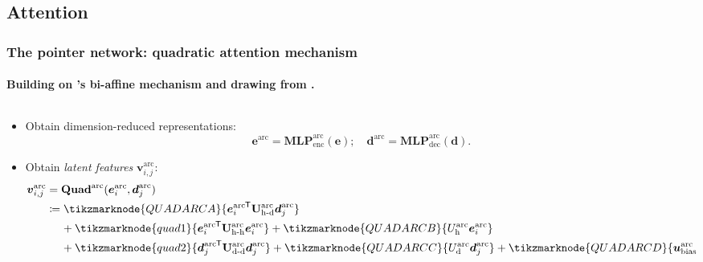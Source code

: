 \documentclass[8pt]{beamer}
\theoremstyle{definition}
\theoremstyle{plain}
\theoremstyle{definition}
\theoremstyle{remark}
\numberwithin{equation}{section}
\numberwithin{figure}{section}
\numberwithin{table}{section}
\newcommand*{\tran}{^{\mkern-1.5mu\mathsf{T}}}
\begin{document}
\subsection{Attention}
\begin{frame}
    \frametitle{The pointer network: quadratic attention mechanism}
    \framesubtitle{Building on \textcite{dozat2016deep}'s bi-affine mechanism and drawing from \textcite{vinyals2015pointer}.}
    \begin{columns}[t,onlytextwidth]
        \begin{column}[t]{0.52\textwidth}
            \begin{itemize}
            \item<2-> Obtain dimension-reduced representations:
            \[
                \boldsymbol{e}^{\text{arc}} = \mathbf{MLP}_{\text{enc}}^{\text{arc}}(\boldsymbol{e}); \quad \boldsymbol{d}^{\text{arc}} = \mathbf{MLP}_{\text{dec}}^{\text{arc}}(\boldsymbol{d}).
            \]

            \item<3-> Obtain \textit{latent features} \(\boldsymbol{v}_{i,j}^{\text{arc}}\):
            \begin{align*}
                \boldsymbol{v}^{\text{arc}}_{i,j} &= \mathbf{Quad}^{\text{arc}}(\boldsymbol{e}^{\text{arc}}_{i}, \boldsymbol{d}^{\text{arc}}_{j}) \\
                &\coloneqq \tikzmarknode{QUADARCA}{{\boldsymbol{e}^{\text{arc}}_{i}}\tran \mathbf{U}_{\text{h-d}}^{\text{arc}} \boldsymbol{d}_{j}^{\text{arc}}} \\
                    &\phantom{\coloneqq}\   + \tikzmarknode{quad1}{
                        {\boldsymbol{e}_{i}^{\text{arc}}}\tran \mathbf{U}_{\text{h-h}}^{\text{arc}} \boldsymbol{e}_{i}^{\text{arc}}
                    } + \tikzmarknode{QUADARCB}{U_{\text{h}}^{\text{arc}} \boldsymbol{e}_{i}^{\text{arc}}} \\
                    &\phantom{\coloneqq}\ + \tikzmarknode{quad2}{{\boldsymbol{d}_{j}^{\text{arc}}}\tran \mathbf{U}_{\text{d-d}}^{\text{arc}} \boldsymbol{d}_{j}^{\text{arc}}}
                    + \tikzmarknode{QUADARCC}{U_{\text{d}}^{\text{arc}} \boldsymbol{d}_{j}^{\text{arc}}}
                    + \tikzmarknode{QUADARCD}{\boldsymbol{u}_{\text{bias}}^{\text{arc}}}.
            \end{align*}


\end{itemize}
\end{column}
\end{columns}
\end{frame}
\end{document}
